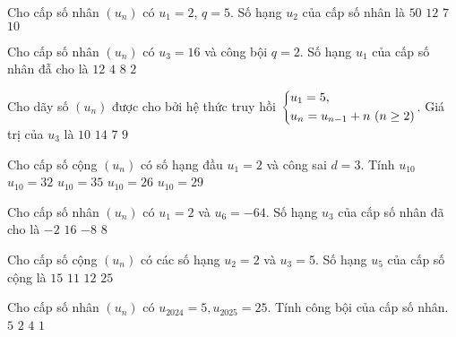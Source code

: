 \begin{ex}
Cho cấp số nhân $(u_n)$ có $u_1=2$, $q=5$. Số hạng $u_2$ của cấp số nhân là
\choice
{$50$}
{$12$}
{$7$}
{\True $10$}
\end{ex}
\begin{ex}
Cho cấp số nhân $(u_n)$ có $u_3=16$ và công bội $q=2$. Số hạng $u_1$ của cấp số nhân đẫ cho là
\choice
{$12$}
{\True $4$}
{$8$}
{$2$}
\end{ex}
\begin{ex}
Cho dãy số $(u_n)$ được cho bởi hệ thức truy hồi $\left\{\begin{aligned}& u_1=5,\\ &u_n=u_{n-1}+n\ (n\ge 2)\end{aligned}\right.$. Giá trị của $u_3$ là
\choice
{\True $10$}
{$14$}
{$7$}
{$9$}
\end{ex}
\begin{ex}
Cho cấp số cộng $(u_n)$ có số hạng đầu $u_1=2$ và công sai $d=3$. Tính $u_{10}$
\choice
{$u_{10}=32$}
{$u_{10}=35$}
{$u_{10}=26$}
{\True $u_{10}=29$}
\end{ex}
\begin{ex}
Cho cấp số nhân $(u_n)$ có $u_1=2$ và $u_6=-64$. Số hạng $u_3$ của cấp số nhân đã cho là 
\choice
{$-2$}
{$16$}
{$-8$}
{\True $8$}
\end{ex}
\begin{ex}
Cho cấp số cộng $(u_n)$ có các số hạng $u_2=2$ và $u_3=5$. Số hạng $u_5$ của cấp số cộng là
\choice
{$15$}
{\True $11$}
{$12$}
{$25$}
\end{ex}
\begin{ex}
Cho cấp số nhân $(u_n)$ có $u_{2024}=5,u_{2025}=25$. Tính công bội của cấp số nhân.
\choice
{\True $5$}
{$2$}
{$4$}
{$1$}
\end{ex}
